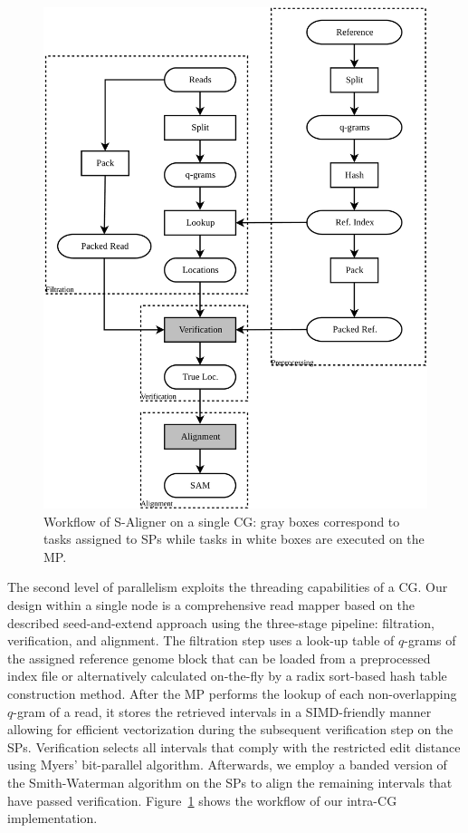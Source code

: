 \documentclass[conference]{IEEEtran}
\begin{document}
\begin{figure}[!htb]
	\includegraphics[width=1\linewidth]{FrmWk}
	\caption{Workflow of S-Aligner on a single CG: gray boxes correspond to tasks assigned to SPs while tasks in white boxes are executed on the MP.}
	\label{FrmWk}
\end{figure}

The second level of parallelism exploits the threading capabilities of a CG. Our design within a single node is a comprehensive read mapper based on the described seed-and-extend approach using the three-stage pipeline: filtration, verification, and alignment. The filtration step uses a look-up table of $q$-grams of the assigned reference genome block that can be loaded from a preprocessed index file or alternatively calculated on-the-fly by a radix sort-based hash table construction method. After the MP performs the lookup of each non-overlapping $q$-gram of a read, it stores the retrieved intervals in a SIMD-friendly manner allowing for efficient vectorization during the subsequent verification step on the SPs. Verification selects all intervals that comply with the restricted edit distance using Myers' bit-parallel algorithm. Afterwards, we employ a banded version of the Smith-Waterman algorithm on the SPs to align the remaining intervals that have passed verification. Figure~\ref{FrmWk} shows the workflow of our intra-CG implementation.
\end{document}
